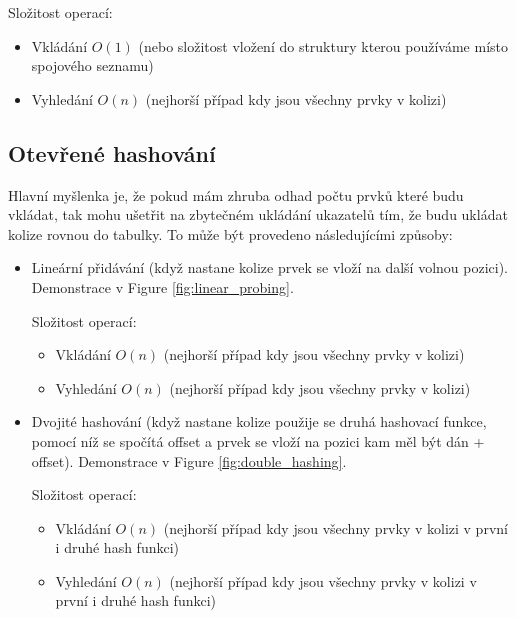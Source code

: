 \documentclass{book}
\begin{document}
Složitost operací:
\begin{itemize}
\item Vkládání $O(1)$ (nebo složitost vložení do struktury kterou používáme místo spojového seznamu)
\item Vyhledání $O(n)$ (nejhorší případ kdy jsou všechny prvky v kolizi)
\end{itemize}

\subsection{Otevřené hashování}
Hlavní myšlenka je, že pokud mám zhruba odhad počtu prvků které budu vkládat, tak mohu ušetřit na zbytečném ukládání ukazatelů tím, že budu ukládat kolize rovnou do tabulky. To může být provedeno následujícími způsoby:
\begin{itemize}
\item Lineární přidávání (když nastane kolize prvek se vloží na další volnou pozici). Demonstrace v Figure \ref{fig:linear_probing}.

Složitost operací:
\begin{itemize}
\item Vkládání $O(n)$ (nejhorší případ kdy jsou všechny prvky v kolizi)
\item Vyhledání $O(n)$ (nejhorší případ kdy jsou všechny prvky v kolizi)
\end{itemize}

\item Dvojité hashování (když nastane kolize použije se druhá hashovací funkce, pomocí níž se spočítá offset a prvek se vloží na pozici kam měl být dán + offset). Demonstrace v Figure \ref{fig:double_hashing}.

Složitost operací:
\begin{itemize}
\item Vkládání $O(n)$ (nejhorší případ kdy jsou všechny prvky v kolizi v první i druhé hash funkci)
\item Vyhledání $O(n)$ (nejhorší případ kdy jsou všechny prvky v kolizi v první i druhé hash funkci)
\end{itemize}

\end{itemize}
\end{document}
